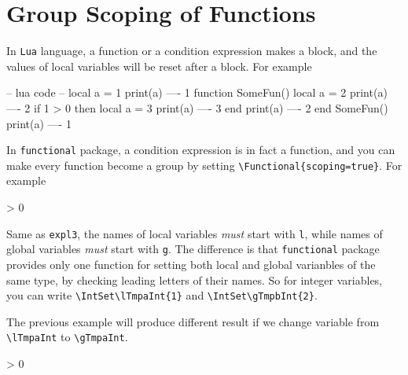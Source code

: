 \documentclass[oneside]{book}
\begin{document}

\section{Group Scoping of Functions}

In \verb!Lua! language, a function or a condition expression makes a block,
and the values of local variables will be reset after a block.
For example

\begin{code}
-- lua code --
local a = 1
print(a)          ---- 1
function SomeFun()
  local a = 2
  print(a)        ---- 2
  if 1 > 0 then
    local a = 3
    print(a)      ---- 3
  end
  print(a)        ---- 2
end
SomeFun()
print(a)          ---- 1
\end{code}

In \verb!functional! package, a condition expression is in fact a function,
and you can make every function become a group by setting
\verb!\Functional{scoping=true}!. For example

\begin{codehigh}
\ExplSyntaxOn
\IntSet {}
\IntLog \lTmpaInt             %
\PrgNewFunction \SomeFun { } {
  \IntSet {}
  \IntLog \lTmpaInt           %
   > {0} {
    \IntSet {}
    \IntLog \lTmpaInt         %
  }{ }
  \IntLog \lTmpaInt           %
}
\SomeFun
\IntLog \lTmpaInt             %
\ExplSyntaxOff
\end{codehigh}

Same as \verb!expl3!, the names of local variables \emph{must} start with \verb!l!,
while names of global variables \emph{must} start with \verb!g!.
The difference is that \verb!functional! package provides only one function for setting
both local and global varianbles of the same type,
by checking leading letters of their names. So for integer variables, you can write
\verb!\IntSet\lTmpaInt{1}! and \verb!\IntSet\gTmpbInt{2}!.

The previous example will produce different result
if we change variable from \verb!\lTmpaInt! to \verb!\gTmpaInt!.

\begin{codehigh}
\IntSet {}
\IntLog \gTmpaInt             %
\PrgNewFunction \SomeFun { } {
  \IntSet {}
  \IntLog \gTmpaInt           %
   > {0} {
    \IntSet {}
    \IntLog \gTmpaInt         %
  }{ }
  \IntLog \gTmpaInt           %
}
\SomeFun
\IntLog \gTmpaInt             %
\end{codehigh}
\end{document}
